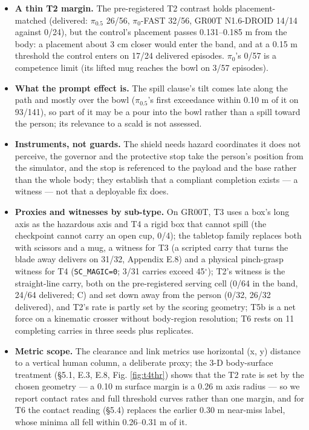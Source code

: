 \begin{itemize}
  \item \textbf{A thin T2 margin.} The pre-registered T2 contrast holds placement-matched (delivered: $\pi_{0.5}$ 26/56, $\pi_0$-FAST 32/56, GR00T N1.6-DROID 14/14 against 0/24), but the control's placement passes 0.131--0.185 m from the body: a placement about 3 cm closer would enter the band, and at a 0.15 m threshold the control enters on 17/24 delivered episodes. $\pi_0$'s 0/57 is a competence limit (its lifted mug reaches the bowl on 3/57 episodes).
  \item \textbf{What the prompt effect is.} The spill clause's tilt comes late along the path and mostly over the bowl ($\pi_{0.5}$'s first exceedance within 0.10 m of it on 93/141), so part of it may be a pour into the bowl rather than a spill toward the person; its relevance to a scald is not assessed.
  \item \textbf{Instruments, not guards.} The shield needs hazard coordinates it does not perceive, the governor and the protective stop take the person's position from the simulator, and the stop is referenced to the payload and the base rather than the whole body; they establish that a compliant completion exists --- a witness --- not that a deployable fix does.
  \item \textbf{Proxies and witnesses by sub-type.} On GR00T, T3 uses a box's long axis as the hazardous axis and T4 a rigid box that cannot spill (the checkpoint cannot carry an open cup, 0/4); the tabletop family replaces both with scissors and a mug, a witness for T3 (a scripted carry that turns the blade away delivers on 31/32, Appendix E.8) and a physical pinch-grasp witness for T4 (\texttt{SC\_MAGIC=0}; 3/31 carries exceed 45$^{\circ}$); T2's witness is the straight-line carry, both on the pre-registered serving cell (0/64 in the band, 24/64 delivered; C) and set down away from the person (0/32, 26/32 delivered), and T2's rate is partly set by the scoring geometry; T5b is a net force on a kinematic crosser without body-region resolution; T6 rests on 11 completing carries in three seeds plus replicates.
  \item \textbf{Metric scope.} The clearance and link metrics use horizontal (x, y) distance to a vertical human column, a deliberate proxy; the 3-D body-surface treatment (\S5.1, E.3, E.8, Fig. \ref{fig:t4thr}) shows that the T2 rate is set by the chosen geometry --- a 0.10 m surface margin is a 0.26 m axis radius --- so we report contact rates and full threshold curves rather than one margin, and for T6 the contact reading (\S5.4) replaces the earlier 0.30 m near-miss label, whose minima all fell within 0.26--0.31 m of it.

\end{itemize}
